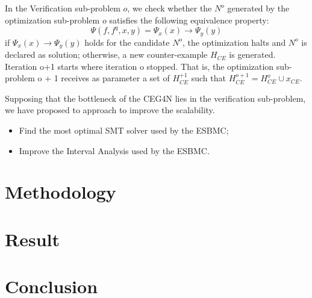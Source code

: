 \documentclass[conference]{IEEEtran}
\begin{document}
In the Verification sub-problem $o$, we check whether the $N^o$ generated by the optimization sub-problem $o$ satisfies the following equivalence property:
\begin{equation}
\Psi(f,f^q, x,y)=\Psi_x(x)\rightarrow \Psi_y(y)
\end{equation}
if  $\Psi_x(x)\rightarrow \Psi_y(y)$ holds for the candidate $N^o$, the optimization halts and $N^o$ is declared as solution; otherwise, a new counter-example $H_{CE}$ is generated. Iteration o+1 starts where iteration o stopped. That is, the optimization sub-problem o + 1 receives as parameter a set of $H^{+1}_{CE}$ such that $H^{o+1}_{CE}=H^o_{CE}\cup x_{CE}$.

Supposing that the bottleneck of the CEG4N lies in the verification sub-problem, we have proposed to approach to improve the scalability. 


\begin{itemize}
    \item Find the most optimal SMT solver used by the ESBMC;
    \item Improve the Interval Analysis used by the ESBMC.
\end{itemize}
\section{Methodology}
\section{Result}
\section{Conclusion}

\subsection{}



\end{document}
